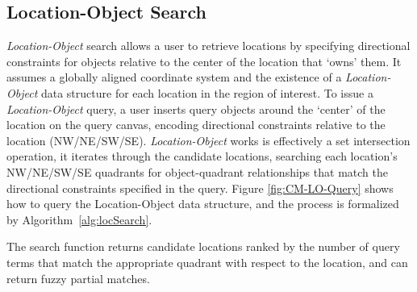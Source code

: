 \begin{algorithm}[h!]
\begin{algorithmic}
                \Else
                \EndIf 
            \EndFor
        \EndProcedure
    \end{algorithmic}
\end{algorithm}


\subsection{Location-Object Search}
\par{


    \textit{Location-Object} search allows a user to retrieve locations by specifying directional constraints for objects relative to the center of the location that `owns' them. 
    It assumes a globally aligned coordinate system and the existence of a \textit{Location-Object} data structure for each location in the region of interest.
    To issue a \textit{Location-Object} query, a user inserts query objects around the `center' of the location on the query canvas, encoding directional constraints relative to the location (NW/NE/SW/SE). 
    \textit{Location-Object} works is effectively a set intersection operation, it iterates through the candidate locations, searching each location's NW/NE/SW/SE quadrants for object-quadrant relationships that match the directional constraints specified in the query.
    Figure \ref{fig:CM-LO-Query} shows how to query the Location-Object data structure, and the process is formalized by Algorithm~\ref{alg:locSearch}.
}
\par{
    The search function returns candidate locations ranked by the number of query terms that match the appropriate quadrant with respect to the location, and can return fuzzy partial matches.  
    }

